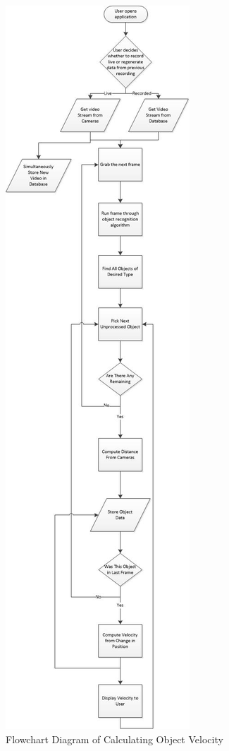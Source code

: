 \documentclass[letterpaper,10pt,onecolumn,draftclsnofoot]{IEEEtran}
\begin{document}
\begin{figure}[H]
\includegraphics[scale=.5]{flowchart}
\caption{Flowchart Diagram of Calculating Object Velocity}
\label{fig:flowchart}
\end{figure}
\end{document}
